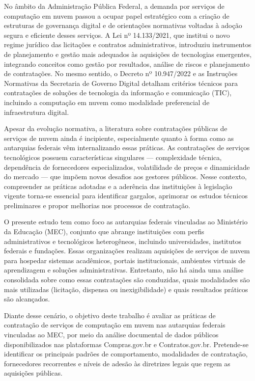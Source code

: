 \documentclass[a4paper, 12pt,brazil]{article}
\begin{document}
No âmbito da Administração Pública Federal, a demanda por serviços de computação em nuvem passou a ocupar papel estratégico com a criação de estruturas de governança digital e de orientações normativas voltadas à adoção segura e eficiente desses serviços. A Lei nº 14.133/2021, que institui o novo regime jurídico das licitações e contratos administrativos, introduziu instrumentos de planejamento e gestão mais adequados às aquisições de tecnologias emergentes, integrando conceitos como gestão por resultados, análise de riscos e planejamento de contratações. No mesmo sentido, o Decreto nº 10.947/2022 e as Instruções Normativas da Secretaria de Governo Digital detalham critérios técnicos para contratações de soluções de tecnologia da informação e comunicação (TIC), incluindo a computação em nuvem como modalidade preferencial de infraestrutura digital.

Apesar da evolução normativa, a literatura sobre contratações públicas de serviços de nuvem ainda é incipiente, especialmente quanto à forma como as autarquias federais vêm internalizando essas práticas. As contratações de serviços tecnológicos possuem características singulares --- complexidade técnica, dependência de fornecedores especializados, volatilidade de preços e dinamicidade do mercado --- que impõem novos desafios aos gestores públicos. Nesse contexto, compreender as práticas adotadas e a aderência das instituições à legislação vigente torna-se essencial para identificar gargalos, aprimorar os estudos técnicos preliminares e propor melhorias nos processos de contratação.

O presente estudo tem como foco as autarquias federais vinculadas ao Ministério da Educação (MEC), conjunto que abrange instituições com perfis administrativos e tecnológicos heterogêneos, incluindo universidades, institutos federais e fundações. Essas organizações realizam aquisições de serviços de nuvem para hospedar sistemas acadêmicos, portais institucionais, ambientes virtuais de aprendizagem e soluções administrativas. Entretanto, não há ainda uma análise consolidada sobre como essas contratações são conduzidas, quais modalidades são mais utilizadas (licitação, dispensa ou inexigibilidade) e quais resultados práticos são alcançados.

Diante desse cenário, o objetivo deste trabalho é avaliar as práticas de contratação de serviços de computação em nuvem nas autarquias federais vinculadas ao MEC, por meio da análise documental de dados públicos disponibilizados nas plataformas Compras.gov.br\cite{comprasgov} e Contratos.gov.br\cite{contratosgov}. Pretende-se identificar os principais padrões de comportamento, modalidades de contratação, fornecedores recorrentes e níveis de adesão às diretrizes legais que regem as aquisições públicas.
\end{document}

